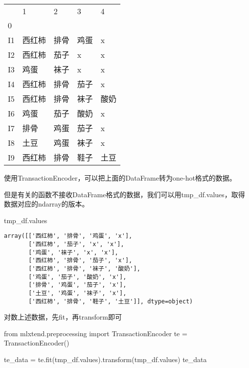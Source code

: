 \documentclass[
  letterpaper,
  DIV=11,
  numbers=noendperiod]{scrreprt}
\newenvironment{Shaded}{\begin{snugshade}}{\end{snugshade}}
\newcommand{\ImportTok}[1]{\textcolor[rgb]{0.00,0.46,0.62}{#1}}
\newcommand{\NormalTok}[1]{\textcolor[rgb]{0.00,0.23,0.31}{#1}}
\newcommand{\OperatorTok}[1]{\textcolor[rgb]{0.37,0.37,0.37}{#1}}
\begin{document}
\begin{longtable}[]{@{}lllll@{}}
\toprule\noalign{}
& 1 & 2 & 3 & 4 \\
0 & & & & \\
\midrule\noalign{}
\endhead
\bottomrule\noalign{}
\endlastfoot
I1 & 西红柿 & 排骨 & 鸡蛋 & x \\
I2 & 西红柿 & 茄子 & x & x \\
I3 & 鸡蛋 & 袜子 & x & x \\
I4 & 西红柿 & 排骨 & 茄子 & x \\
I5 & 西红柿 & 排骨 & 袜子 & 酸奶 \\
I6 & 鸡蛋 & 茄子 & 酸奶 & x \\
I7 & 排骨 & 鸡蛋 & 茄子 & x \\
I8 & 土豆 & 鸡蛋 & 袜子 & x \\
I9 & 西红柿 & 排骨 & 鞋子 & 土豆 \\
\end{longtable}

使用TransactionEncoder，可以把上面的DataFrame转为one-hot格式的数据。

但是有关的函数不接收DataFrame格式的数据，我们可以用tmp\_df.values，取得数据对应的ndarray的版本。

\begin{Shaded}
\begin{Highlighting}[]
\NormalTok{tmp\_df.values}
\end{Highlighting}
\end{Shaded}

\begin{verbatim}
array([['西红柿', '排骨', '鸡蛋', 'x'],
       ['西红柿', '茄子', 'x', 'x'],
       ['鸡蛋', '袜子', 'x', 'x'],
       ['西红柿', '排骨', '茄子', 'x'],
       ['西红柿', '排骨', '袜子', '酸奶'],
       ['鸡蛋', '茄子', '酸奶', 'x'],
       ['排骨', '鸡蛋', '茄子', 'x'],
       ['土豆', '鸡蛋', '袜子', 'x'],
       ['西红柿', '排骨', '鞋子', '土豆']], dtype=object)
\end{verbatim}

对数上述数据，先fit，再transform即可

\begin{Shaded}
\begin{Highlighting}[]
\ImportTok{from}\NormalTok{ mlxtend.preprocessing }\ImportTok{import}\NormalTok{ TransactionEncoder}
\NormalTok{te }\OperatorTok{=}\NormalTok{ TransactionEncoder()}


\NormalTok{te\_data }\OperatorTok{=}\NormalTok{ te.fit(tmp\_df.values).transform(tmp\_df.values) }
\NormalTok{te\_data}
\end{Highlighting}
\end{Shaded}
\end{document}
